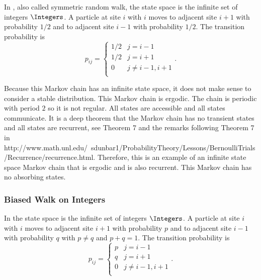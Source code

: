 \documentclass[12pt]{article}
\begin{document}
In , also called symmetric%
random walk, the state space is the infinite set of integers \(
\Integers \).  A particle at site \( i \) with \( i \) moves to adjacent
site \( i+1 \) with probability \( 1/2 \) and to adjacent site \( i-1 \)
with probability \( 1/2 \).  The transition probability is
\[
    p_{ij} =
    \begin{cases}
        1/2 & j = i-1 \\
        1/2 & j = i+1 \\
        0 & j \ne i-1, i+1 \\
    \end{cases}
    .
\]

Because this Markov chain has an infinite state space, it does not make
sense to consider a stable distribution.  This Markov chain is ergodic.
The chain is periodic with period \( 2 \) so it is not regular.  All
states are accessible and all states communicate.  It is a deep theorem
that the Markov chain has no transient states and all states are
recurrent, see Theorem 7 and the remarks following Theorem 7 in 
{http://www.math.unl.edu/~sdunbar1/ProbabilityTheory/Lessons/BernoulliTrials/Recurrence/recurrence.html}.
Therefore, this is an example of an infinite state space Markov chain
that is ergodic and is also recurrent.  This Markov chain has no
absorbing states.

\subsubsection*{Biased Walk on Integers}

In  the state space is the%
infinite set of integers \( \Integers \).  A particle at site \( i \)
with \( i \) moves to adjacent site \( i+1 \) with probability \( p \)
and to adjacent site \( i-1 \) with probability \( q \) with \( p \ne q \)
and \( p+q = 1 \).  The transition probability is
\[
    p_{ij} =
    \begin{cases}
        p & j = i-1 \\
        q & j = i+1 \\
        0 & j \ne i-1, i+1 \\
    \end{cases}
    .
\]
\end{document}
